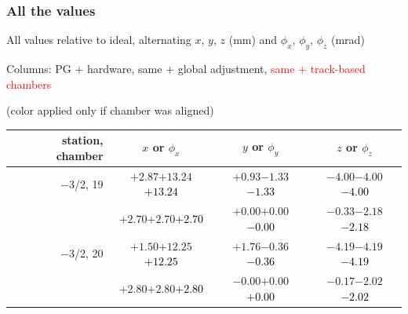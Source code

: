 \documentclass[compress]{beamer}
\begin{document}
\begin{frame}
\frametitle{All the values}
\tiny

All values relative to ideal, alternating $x$, $y$, $z$ (mm) and $\phi_x$, $\phi_y$, $\phi_z$ (mrad)

Columns: PG $+$ hardware, same $+$ global adjustment, \textcolor{red}{same $+$ track-based chambers}

\hfill (color applied only if chamber was aligned)

\vfill
\renewcommand{\arraystretch}{1.1}
\begin{tabular}{r | c | c | c}
station, chamber & $x$ or $\phi_x$ & $y$ or $\phi_y$ & $z$ or $\phi_z$ \\\hline
$-$3/2, 19 & $+2.87$\hspace{0.1 cm}$+13.24$\hspace{0.1 cm}\textcolor{black}{$+13.24$} & $+0.93$\hspace{0.1 cm}$-1.33$\hspace{0.1 cm}\textcolor{black}{$-1.33$} & $-4.00$\hspace{0.1 cm}$-4.00$\hspace{0.1 cm}\textcolor{black}{$-4.00$} \\
           & $+2.70$\hspace{0.1 cm}$+2.70$\hspace{0.1 cm}\textcolor{black}{$+2.70$} & $+0.00$\hspace{0.1 cm}$+0.00$\hspace{0.1 cm}\textcolor{black}{$-0.00$} & $-0.33$\hspace{0.1 cm}$-2.18$\hspace{0.1 cm}\textcolor{black}{$-2.18$} \\
$-$3/2, 20 & $+1.50$\hspace{0.1 cm}$+12.25$\hspace{0.1 cm}\textcolor{black}{$+12.25$} & $+1.76$\hspace{0.1 cm}$-0.36$\hspace{0.1 cm}\textcolor{black}{$-0.36$} & $-4.19$\hspace{0.1 cm}$-4.19$\hspace{0.1 cm}\textcolor{black}{$-4.19$} \\
           & $+2.80$\hspace{0.1 cm}$+2.80$\hspace{0.1 cm}\textcolor{black}{$+2.80$} & $-0.00$\hspace{0.1 cm}$+0.00$\hspace{0.1 cm}\textcolor{black}{$+0.00$} & $-0.17$\hspace{0.1 cm}$-2.02$\hspace{0.1 cm}\textcolor{black}{$-2.02$} \\

\end{tabular}
\end{frame}
\end{document}
